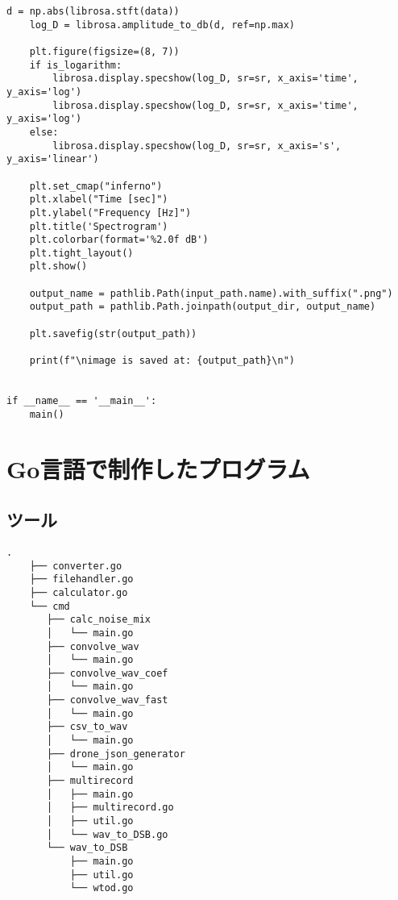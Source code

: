 \begin{lstlisting}[caption=plot\_spectrogram\_librosa.py,label=plot_spectrogram_librosa.py]
    d = np.abs(librosa.stft(data))
    log_D = librosa.amplitude_to_db(d, ref=np.max)

    plt.figure(figsize=(8, 7))
    if is_logarithm:
        librosa.display.specshow(log_D, sr=sr, x_axis='time', y_axis='log')
        librosa.display.specshow(log_D, sr=sr, x_axis='time', y_axis='log')
    else:
        librosa.display.specshow(log_D, sr=sr, x_axis='s', y_axis='linear')

    plt.set_cmap("inferno")
    plt.xlabel("Time [sec]")
    plt.ylabel("Frequency [Hz]")
    plt.title('Spectrogram')
    plt.colorbar(format='%2.0f dB')
    plt.tight_layout()
    plt.show()

    output_name = pathlib.Path(input_path.name).with_suffix(".png")
    output_path = pathlib.Path.joinpath(output_dir, output_name)

    plt.savefig(str(output_path))

    print(f"\nimage is saved at: {output_path}\n")


if __name__ == '__main__':
    main()
\end{lstlisting}


\section{Go言語で制作したプログラム}



\subsection{ツール}

\begin{lstlisting}[caption=ディレクトリ構成,label=ディレクトリ構成]
    .
    ├── converter.go
    ├── filehandler.go
    ├── calculator.go
    └── cmd
       ├── calc_noise_mix
       │   └── main.go
       ├── convolve_wav
       │   └── main.go
       ├── convolve_wav_coef
       │   └── main.go
       ├── convolve_wav_fast
       │   └── main.go
       ├── csv_to_wav
       │   └── main.go
       ├── drone_json_generator
       │   └── main.go
       ├── multirecord
       │   ├── main.go
       │   ├── multirecord.go
       │   ├── util.go
       │   └── wav_to_DSB.go
       └── wav_to_DSB
           ├── main.go
           ├── util.go
           └── wtod.go
\end{lstlisting}

